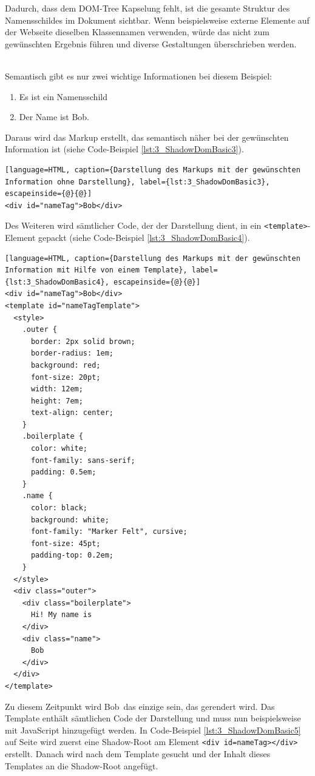 Dadurch, dass dem DOM-Tree Kapselung fehlt, ist die gesamte Struktur des Namensschildes im Dokument sichtbar. Wenn beispielsweise externe Elemente auf der Webseite dieselben Klassennamen verwenden, würde das nicht zum gewünschten Ergebnis führen und diverse Gestaltungen überschrieben werden.

\begin{enumerate}
 \hfill \\
Semantisch gibt es nur zwei wichtige Informationen bei diesem Beispiel:
\begin{enumerate}
\item Es ist ein Namensschild
\item Der Name ist \glqq Bob\grqq .
\end{enumerate}
Daraus wird das Markup erstellt, das semantisch näher bei der gewünschten Information ist (siehe Code-Beispiel \ref{lst:3_ShadowDomBasic3}).

\begin{lstlisting}[language=HTML, caption={Darstellung des Markups mit der gewünschten Information ohne Darstellung}, label={lst:3_ShadowDomBasic3}, escapeinside={@}{@}]
<div id="nameTag">Bob</div>
\end{lstlisting}

Des Weiteren wird sämtlicher Code, der der Darstellung dient, in ein \lstinline|<template>|-Element gepackt (siehe Code-Beispiel \ref{lst:3_ShadowDomBasic4}).

\begin{lstlisting}[language=HTML, caption={Darstellung des Markups mit der gewünschten Information mit Hilfe von einem Template}, label={lst:3_ShadowDomBasic4}, escapeinside={@}{@}]
<div id="nameTag">Bob</div>
<template id="nameTagTemplate">
  <style>
    .outer {
      border: 2px solid brown;
      border-radius: 1em;
      background: red;
      font-size: 20pt;
      width: 12em;
      height: 7em;
      text-align: center;
    }
    .boilerplate {
      color: white;
      font-family: sans-serif;
      padding: 0.5em;
    }
    .name {
      color: black;
      background: white;
      font-family: "Marker Felt", cursive;
      font-size: 45pt;
      padding-top: 0.2em;
    }
  </style>
  <div class="outer">
    <div class="boilerplate">
      Hi! My name is
    </div>
    <div class="name">
      Bob
    </div>
  </div>
</template>
\end{lstlisting}

Zu diesem Zeitpunkt wird \glqq Bob\grqq\ das einzige sein, das gerendert wird. Das Template enthält sämtlichen Code der Darstellung und muss nun beispielsweise mit JavaScript hinzugefügt werden. In Code-Beispiel \ref{lst:3_ShadowDomBasic5} auf Seite \pageref{lst:3_ShadowDomBasic5} wird zuerst eine Shadow-Root am Element \lstinline|<div id=nameTag></div>| erstellt. Danach wird nach dem Template gesucht und der Inhalt dieses Templates an die Shadow-Root angefügt.


\end{enumerate}

